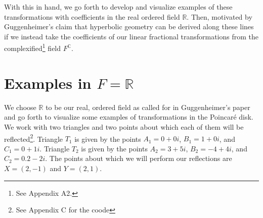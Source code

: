 \documentclass[12pt]{article}
\newcommand{\R}{\mathbb{R}}
\newcommand{\C}{\mathbb{C}}
\newcommand{\fc}{F^{\C}}
\newcommand{\poincare}{Poincar\'{e} }
\theoremstyle{plain}
\theoremstyle{definition}
\begin{document}
With this in hand, we go forth to develop and visualize examples of these transformations with coefficients in the real ordered field $\R$. Then, motivated by Guggenheimer's claim that hyperbolic geometry can be derived along these lines if we instead take the coefficients of our linear fractional transformations from the complexified\footnote{See Appendix A2.} field $\fc$.





\section{Examples in $F = \R$}

\hspace{10mm} We choose $\R$ to be our real, ordered field as called for in Guggenheimer's paper and go forth to visualize some examples of transformations in the \poincare disk. We work with two triangles and two points about which each of them will be reflected\footnote{See Appendix C for the coode}. Triangle $T_1$ is given by the points $A_1 = 0 + 0i$, $B_1 = 1 + 0i$, and $C_1 = 0 + 1i$. Triangle $T_2$ is given by the points $A_2 = 3 + 5i$, $B_2 = -4 + 4i$, and $C_2 = 0.2 - 2i$. The points about which we will perform our reflections are $X = (2, -1)$ and $Y = (2, 1)$.
\end{document}

